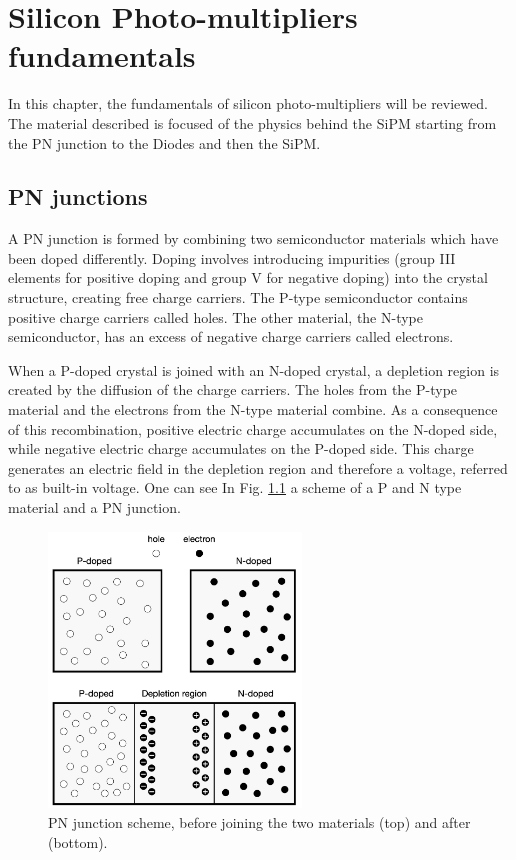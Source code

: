 \chapter{Silicon Photo-multipliers fundamentals}
\label{ch:background}
In this chapter, the fundamentals of silicon photo-multipliers will be reviewed. The material described is focused of the physics behind the SiPM starting from the PN junction to the Diodes and then the SiPM.

%
%
\section{PN junctions}
\label{sec:background:Basic principles:PN junctions}
A PN junction is formed by combining two semiconductor materials which have been doped differently. Doping involves introducing impurities (group III elements for positive doping and  group V for negative doping) into the crystal structure, creating free charge carriers. The P-type semiconductor contains positive charge carriers called holes. The other material, the N-type semiconductor, has an excess of negative charge carriers called electrons. 

When a P-doped crystal is joined with an N-doped crystal, a depletion region is created by the diffusion of the charge carriers. The holes from the P-type material and the electrons from the N-type material combine. As a consequence of this recombination, positive electric charge accumulates on the N-doped side, while negative electric charge accumulates on the P-doped side. This charge generates an electric field in the depletion region and therefore a voltage, referred to as built-in voltage. One can see In Fig. \ref{fig:PN junctions scheme} a scheme of a P and N type material and a PN junction. 
\begin{figure}[htbp]
 \centering
 \includegraphics[width=0.6\textwidth]{gfx/schemes/PN_junction.png}
 \caption{PN junction scheme, before joining the two materials (top) and after (bottom). }
\label{fig:PN junctions scheme}
\end{figure}



